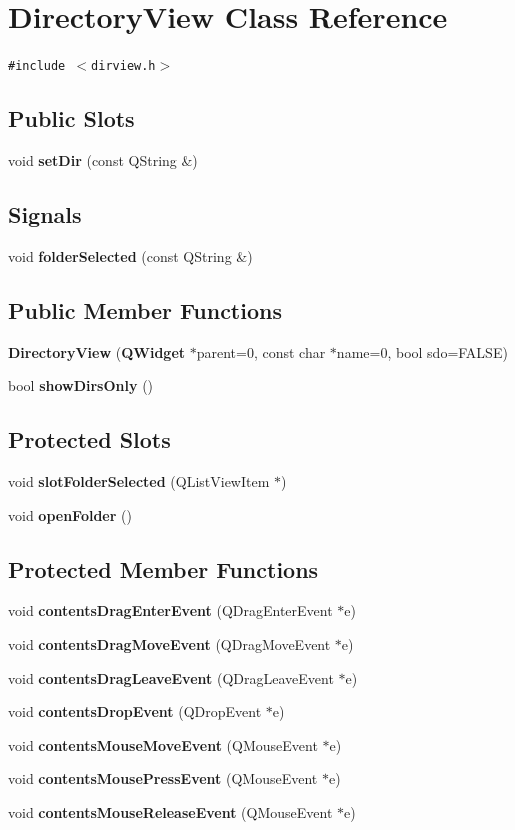 \section{Directory\-View Class Reference}
\label{classDirectoryView}
{\tt \#include $<$dirview.h$>$}

\subsection*{Public Slots}
\begin{CompactItemize}
\item 
void {\bf set\-Dir} (const QString \&)
\end{CompactItemize}
\subsection*{Signals}
\begin{CompactItemize}
\item 
void {\bf folder\-Selected} (const QString \&)
\end{CompactItemize}
\subsection*{Public Member Functions}
\begin{CompactItemize}
\item 
{\bf Directory\-View} ({\bf QWidget} $\ast$parent=0, const char $\ast$name=0, bool sdo=FALSE)
\item 
bool {\bf show\-Dirs\-Only} ()
\end{CompactItemize}
\subsection*{Protected Slots}
\begin{CompactItemize}
\item 
void {\bf slot\-Folder\-Selected} (QList\-View\-Item $\ast$)
\item 
void {\bf open\-Folder} ()
\end{CompactItemize}
\subsection*{Protected Member Functions}
\begin{CompactItemize}
\item 
void {\bf contents\-Drag\-Enter\-Event} (QDrag\-Enter\-Event $\ast$e)
\item 
void {\bf contents\-Drag\-Move\-Event} (QDrag\-Move\-Event $\ast$e)
\item 
void {\bf contents\-Drag\-Leave\-Event} (QDrag\-Leave\-Event $\ast$e)
\item 
void {\bf contents\-Drop\-Event} (QDrop\-Event $\ast$e)
\item 
void {\bf contents\-Mouse\-Move\-Event} (QMouse\-Event $\ast$e)
\item 
void {\bf contents\-Mouse\-Press\-Event} (QMouse\-Event $\ast$e)
\item 
void {\bf contents\-Mouse\-Release\-Event} (QMouse\-Event $\ast$e)
\end{CompactItemize}
